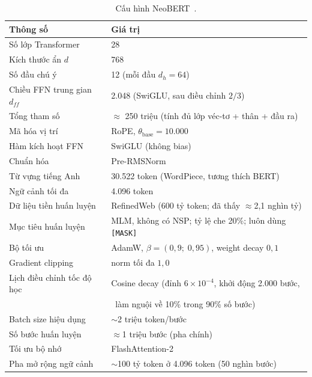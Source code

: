 \begin{table}[ht]
  \caption{Cấu hình NeoBERT~\cite{lebreton2025neobert}.}
  \label{tab:neobert-params}
  \centering
  \small
  \begin{tabular}{ll}
    \hline
    \textbf{Thông số} & \textbf{Giá trị} \\
    \hline
    Số lớp Transformer                 & 28 \\
    Kích thước ẩn $d$                  & 768 \\
    Số đầu chú ý                       & 12 (mỗi đầu $d_h = 64$) \\
    Chiều FFN trung gian $d_{ff}$      & 2.048 (SwiGLU, sau điều chỉnh $2/3$) \\
    Tổng tham số                       & $\approx$ 250 triệu (tính đủ lớp véc-tơ + thân + đầu ra) \\
    Mã hóa vị trí                      & RoPE, $\theta_{\mathrm{base}} = 10.000$ \\
    Hàm kích hoạt FFN                  & SwiGLU (không bias) \\
    Chuẩn hóa                          & Pre-RMSNorm \\
    Từ vựng tiếng Anh                  & 30.522 token (WordPiece, tương thích BERT) \\
    Ngữ cảnh tối đa                    & 4.096 token \\
    \hline
    Dữ liệu tiền huấn luyện           & RefinedWeb (600 tỷ token; đã thấy $\approx$2,1 nghìn tỷ) \\
    Mục tiêu huấn luyện               & MLM, không có NSP; tỷ lệ che 20\%; luôn dùng \texttt{[MASK]} \\
    Bộ tối ưu                          & AdamW, $\beta = (0{,}9;\; 0{,}95)$, weight decay $0{,}1$ \\
    Gradient clipping                  & norm tối đa $1{,}0$ \\
    Lịch điều chỉnh tốc độ học         & Cosine decay (đỉnh $6{\times}10^{-4}$, khởi động 2.000 bước, \\
                                       & \ làm nguội về 10\% trong 90\% số bước) \\
    Batch size hiệu dụng               & $\sim$2 triệu token/bước \\
    Số bước huấn luyện                 & $\approx$1 triệu bước (pha chính) \\
    Tối ưu bộ nhớ                      & FlashAttention-2 \\
    \hline
    Pha mở rộng ngữ cảnh               & $\sim$100 tỷ token ở 4.096 token (50 nghìn bước) \\
    \hline
  \end{tabular}
\end{table}

